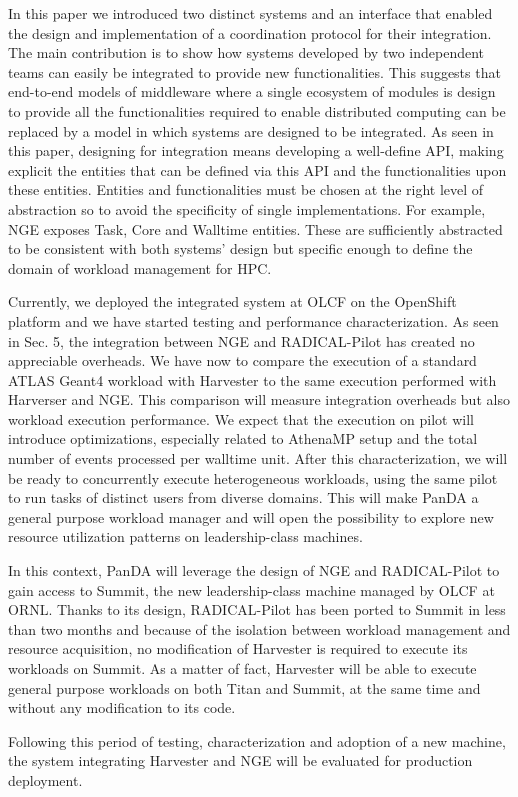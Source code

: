 \documentclass{webofc}
\begin{document}
In this paper we introduced two distinct systems and an interface that
enabled the design and implementation of a coordination protocol for their
integration. The main contribution is to show how systems developed by two
independent teams can easily be integrated to provide new functionalities.
This suggests that end-to-end models of middleware where a single ecosystem
of modules is design to provide all the functionalities required to enable
distributed computing can be replaced by a model in which systems are
designed to be integrated. As seen in this paper, designing for integration
means developing a well-define API, making explicit the entities that can be
defined via this API and the functionalities upon these entities. Entities
and functionalities must be chosen at the right level of abstraction so to
avoid the specificity of single implementations. For example, NGE exposes
Task, Core and Walltime entities. These are sufficiently abstracted to be
consistent with both systems’ design but specific enough to define the domain
of workload management for HPC.

Currently, we deployed the integrated system at OLCF on the OpenShift
platform and we have started testing and performance characterization. As
seen in Sec. 5, the integration between NGE and RADICAL-Pilot has created no
appreciable overheads. We have now to compare the execution of a standard
ATLAS Geant4 workload with Harvester to the same execution performed with
Harverser and NGE. This comparison will measure integration overheads but
also workload execution performance. We expect that the execution on pilot
will introduce optimizations, especially related to AthenaMP setup and the
total number of events processed per walltime unit. After this
characterization, we will be ready to concurrently execute heterogeneous
workloads, using the same pilot to run tasks of distinct users from diverse
domains. This will make PanDA a general purpose workload manager and will
open the possibility to explore new resource utilization patterns on
leadership-class machines.

In this context, PanDA will leverage the design of NGE and RADICAL-Pilot to
gain access to Summit, the new leadership-class machine managed by OLCF at
ORNL. Thanks to its design, RADICAL-Pilot has been ported to Summit in less
than two months and because of the isolation between workload management and
resource acquisition, no modification of Harvester is required to execute its
workloads on Summit. As a matter of fact, Harvester will be able to execute
general purpose workloads on both Titan and Summit, at the same time and
without any modification to its code.

Following this period of testing, characterization and adoption of a new
machine, the system integrating Harvester and NGE will be evaluated for
production deployment.



\end{document}

